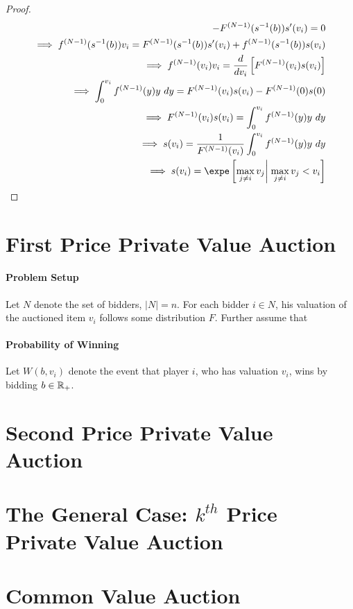 \documentclass{article}
\begin{document}
\begin{proof}
\begin{align}
			- F^{(N-1)}(s^{-1}(b)) s'(v_i) = 0 \\
			\implies f^{(N-1)}(s^{-1}(b)) v_i = F^{(N-1)}(s^{-1}(b)) s'(v_i) + f^{(N-1)}(s^{-1}(b)) s(v_i) \\
			\implies f^{(N-1)}(v_i) v_i = \frac{d}{dv_i} \left[ F^{(N-1)}(v_i) s(v_i) \right] \\
			\implies \int_{0}^{v_i} f^{(N-1)}(y) y\ dy = F^{(N-1)}(v_i) s(v_i) - F^{(N-1)}(0) s(0) \\
			\implies F^{(N-1)}(v_i) s(v_i) = \int_{0}^{v_i} f^{(N-1)}(y) y\ dy \\
			\implies s(v_i) = \frac{1}{F^{(N-1)}(v_i)} \int_{0}^{v_i} f^{(N-1)}(y) y\ dy \\
			\implies s(v_i) = \expe \left[\max_{j \neq i} v_j \right|\left. \max_{j \neq i} v_j < v_i \right]
		\end{align}
	\end{proof}
	
	\section{First Price Private Value Auction}
	\paragraph{Problem Setup} Let $N$ denote the set of bidders, $|N| = n$. For each bidder $i \in N$, his valuation of the auctioned item $v_i$ follows some distribution $F$. Further assume that 
	\paragraph{Probability of Winning} Let $W(b, v_i)$ denote the event that player $i$, who has valuation $v_i$, wins by bidding $b \in \mathbb{R}_+$.
	
	\section{Second Price Private Value Auction}
	
	\section{The General Case: $k^{th}$ Price Private Value Auction}
	
	\section{Common Value Auction}
	
\end{document}
